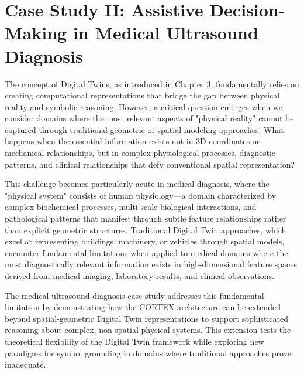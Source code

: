 
\chapter{Case Study II: Assistive Decision-Making in Medical Ultrasound Diagnosis} \label{chp:medical}


The concept of Digital Twins, as introduced in Chapter 3, fundamentally relies on creating computational representations that bridge the gap between physical reality and symbolic reasoning. However, a critical question emerges when we consider domains where the most relevant aspects of "physical reality" cannot be captured through traditional geometric or spatial modeling approaches. What happens when the essential information exists not in 3D coordinates or mechanical relationships, but in complex physiological processes, diagnostic patterns, and clinical relationships that defy conventional spatial representation?

This challenge becomes particularly acute in medical diagnosis, where the "physical system" consists of human physiology—a domain characterized by complex biochemical processes, multi-scale biological interactions, and pathological patterns that manifest through subtle feature relationships rather than explicit geometric structures. Traditional Digital Twin approaches, which excel at representing buildings, machinery, or vehicles through spatial models, encounter fundamental limitations when applied to medical domains where the most diagnostically relevant information exists in high-dimensional feature spaces derived from medical imaging, laboratory results, and clinical observations.

The medical ultrasound diagnosis case study addresses this fundamental limitation by demonstrating how the CORTEX architecture can be extended beyond spatial-geometric Digital Twin representations to support sophisticated reasoning about complex, non-spatial physical systems. This extension tests the theoretical flexibility of the Digital Twin framework while exploring new paradigms for symbol grounding in domains where traditional approaches prove inadequate.

